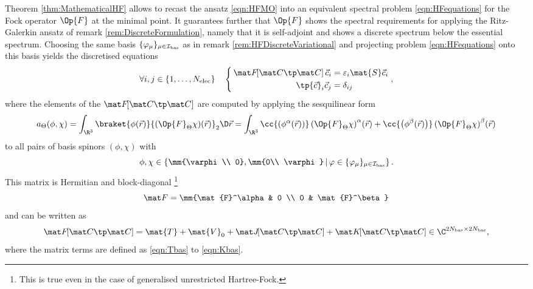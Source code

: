 \begin{rem}
Theorem \vref{thm:MathematicalHF} allows to recast
the \HF ansatz \eqref{eqn:HFMO} into an equivalent
spectral problem \eqref{eqn:HFequations}
for the Fock operator $\Op{F}$ at the minimal point.
It guarantees further that $\Op{F}$
shows the spectral requirements for applying the Ritz-Galerkin ansatz
of remark \vref{rem:DiscreteFormulation},
namely that it is self-adjoint and shows
a discrete spectrum below the essential spectrum.
Choosing the same basis $\{\varphi_\mu\}_{\mu\in\mathcal{I}_\text{bas}}$
as in remark \ref{rem:HFDiscreteVariational}
and projecting problem \eqref{eqn:HFequations} onto this basis
yields the discretised \HF equations
\begin{equation}
	\forall i,j \in \{1,\ldots,\Nelec\} \quad
	\left\{
	\begin{aligned}
	\, \matFfull \vec{c}_i &= \varepsilon_i \mat{S} \vec{c}_i \\
	   \tp{\vec{c}}_i \vec{c}_j &= \delta_{ij}
	\end{aligned}
	\right. ,
	\label{eqn:HFDiscreteEquations}
\end{equation}
where the elements of the  $\matFfull$
are computed by applying the sesquilinear form
\begin{equation}
	a_\Theta(\phi,\chi)
		= \int_{\R^3} \braket{\phi(\vec{r})}{ \left(\Op{F}_\Theta \chi\right)\!(\vec{r})}_2
			\D \vec{r}
		= \int_{\R^3}
			\cc{\left(\phi^\alpha(\vec{r})\right)}
				\left(\Op{F}_\Theta\chi\right)^\alpha\!(\vec{r})
			+ \cc{\left(\phi^\beta(\vec{r})\right)}
				\left(\Op{F}_\Theta\chi\right)^\beta\!(\vec{r})
	\label{eqn:SesquilinearFormFock}
\end{equation}
to all pairs of basis spinors $(\phi, \chi)$ with
\[ \phi, \chi \in \left\{ \mm{\varphi\\ 0}, \mm{0\\ \varphi} \,\middle|\,
	\varphi \in \{\varphi_\mu\}_{\mu\in\Ibas} \right\}.
\]
This matrix is Hermitian and block-diagonal%
\footnote{This is true even in the case of generalised unrestricted Hartree-Fock.}
\[ \matF = \mm{\mat{F}^\alpha & 0 \\ 0 & \mat{F}^\beta} \]
and can be written as
\begin{equation}
	\matFfull = \mat{T} + \mat{V}_0 + \matJfull + \matKfull \in \C^{2\Nbas\times 2\Nbas},
	\label{eqn:FockMatrix}
\end{equation}
where the matrix terms are defined as \eqref{eqn:Tbas} to \eqref{eqn:Kbas}.


\end{rem}
